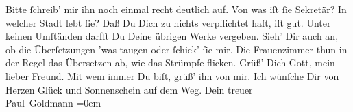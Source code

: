                Bitte ſchreib’ mir ihn noch einmal recht deutlich auf. Von was iſt ſie Sekretär? In welcher Stadt
               lebt ſie? Daß Du Dich zu nichts verpflichtet haſt, iſt gut. Unter keinen Umſtänden
                  {\pb}darfſt Du Deine übrigen Werke vergeben.
                  Sieh\textcolor{gray}{’} Dir auch an, ob die Überſetzungen ’was taugen oder ſchick’
               ſie mir. Die Frauenzimmer thun in der Regel das Übersetzen ab, wie das Strümpfe
               flicken.\pend
           \pstart
           Grüß’ Dich Gott, mein lieber Freund. Mit wem immer Du biſt, grüß’ ihn von mir. Ich
               wünſche Dir von Herzen Glück und Sonnenschein auf dem Weg.\pend
           \pstart
           Dein treuer {\\[\baselineskip]}\spacefill\mbox{Paul Goldmann}\pend
           \leftskip=0em{}\endnumbering{}\begin{anhang}\end{anhang}
      
